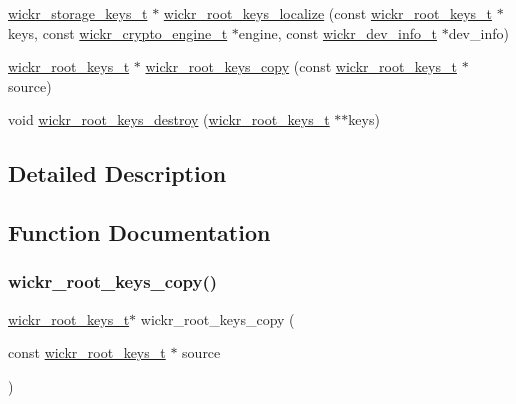 \begin{DoxyCompactItemize}
\mbox{\hyperlink{structwickr__storage__keys}{wickr\+\_\+storage\+\_\+keys\+\_\+t}} $\ast$ \mbox{\hyperlink{group__wickr__root__keys_gaa34dd6c85c667b8b7fb025f56c7bcc46}{wickr\+\_\+root\+\_\+keys\+\_\+localize}} (const \mbox{\hyperlink{structwickr__root__keys}{wickr\+\_\+root\+\_\+keys\+\_\+t}} $\ast$keys, const \mbox{\hyperlink{structwickr__crypto__engine}{wickr\+\_\+crypto\+\_\+engine\+\_\+t}} $\ast$engine, const \mbox{\hyperlink{structwickr__dev__info}{wickr\+\_\+dev\+\_\+info\+\_\+t}} $\ast$dev\+\_\+info)
\item 
\mbox{\hyperlink{structwickr__root__keys}{wickr\+\_\+root\+\_\+keys\+\_\+t}} $\ast$ \mbox{\hyperlink{group__wickr__root__keys_gadda1b8fd1b5cc1cf6b7b2b0e72912858}{wickr\+\_\+root\+\_\+keys\+\_\+copy}} (const \mbox{\hyperlink{structwickr__root__keys}{wickr\+\_\+root\+\_\+keys\+\_\+t}} $\ast$source)
\item 
void \mbox{\hyperlink{group__wickr__root__keys_gacabc33b7c56cbc84a5085d0a4330694f}{wickr\+\_\+root\+\_\+keys\+\_\+destroy}} (\mbox{\hyperlink{structwickr__root__keys}{wickr\+\_\+root\+\_\+keys\+\_\+t}} $\ast$$\ast$keys)
\end{DoxyCompactItemize}


\subsection{Detailed Description}


\subsection{Function Documentation}
\mbox{\label{group__wickr__root__keys_gadda1b8fd1b5cc1cf6b7b2b0e72912858}} 
\subsubsection{\texorpdfstring{wickr\+\_\+root\+\_\+keys\+\_\+copy()}{wickr\_root\_keys\_copy()}}
{\footnotesize\ttfamily \mbox{\hyperlink{structwickr__root__keys}{wickr\+\_\+root\+\_\+keys\+\_\+t}}$\ast$ wickr\+\_\+root\+\_\+keys\+\_\+copy (\begin{DoxyParamCaption}\item[{const \mbox{\hyperlink{structwickr__root__keys}{wickr\+\_\+root\+\_\+keys\+\_\+t}} $\ast$}]{source }\end{DoxyParamCaption})}

